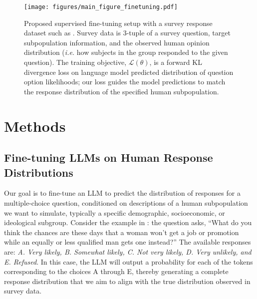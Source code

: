 \begin{figure}[!t]
    \centering
    \texttt{[image: figures/main\_figure\_finetuning.pdf]}
    \caption{
    Proposed supervised fine-tuning setup with a survey response dataset such as \OURDATA.
    Survey data is 3-tuple of a survey question, target subpopulation information, and the observed human opinion distribution (\textit{i.e.} how subjects in the group responded to the given question).
    The training objective, $\mathcal{L}(\theta)$, is a forward KL divergence loss on language model predicted distribution of question option likelihoods; our loss guides the model predictions to match the response distribution of the specified human subpopulation.
    }
    \label{fig:method}
\end{figure}

\section{Methods}
\label{section_method}

\subsection{Fine-tuning LLMs on Human Response Distributions}
\label{section_method_fine_tuning_objective}
Our goal is to fine-tune an LLM to predict the distribution of responses for a multiple-choice question, conditioned on descriptions of a human subpopulation we want to simulate, typically a specific demographic, socioeconomic, or ideological subgroup. 
Consider the example in : the question asks, “What do you think the chances are these days that a woman won't get a job or promotion while an equally or less qualified man gets one instead?” The available responses are: \emph{A. Very likely, B. Somewhat likely, C. Not very likely, D. Very unlikely, and E. Refused}. 
In this case, the LLM will output a probability for each of the tokens corresponding to the choices A through E, thereby generating a complete response distribution that we aim to align with the true distribution observed in survey data.

